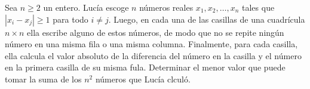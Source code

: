 Sea $n \geq 2$ un entero. Lucía escoge $n$ números reales $x_1, x_2, \dots, x_n$ tales que $|x_i - x_j|\geq 1$ para todo $i \neq j.$ Luego, en cada una de las casillas de una cuadrícula $n\times n$ ella escribe alguno de estos números, de modo que no se repite ningún número en una misma fila o una misma columna. Finalmente, para cada casilla, ella calcula el valor absoluto de la diferencia del número en la casilla y el número en la primera casilla de su misma fula. Determinar el menor valor que puede tomar la suma de los $n^2$ números que Lucía clculó.